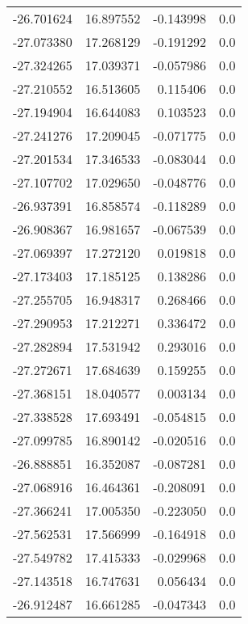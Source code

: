 \begin{tabular}{rrrr}
      -26.701624 &        16.897552 &   -0.143998 &   0.0 \\
      -27.073380 &        17.268129 &   -0.191292 &   0.0 \\
      -27.324265 &        17.039371 &   -0.057986 &   0.0 \\
      -27.210552 &        16.513605 &    0.115406 &   0.0 \\
      -27.194904 &        16.644083 &    0.103523 &   0.0 \\
      -27.241276 &        17.209045 &   -0.071775 &   0.0 \\
      -27.201534 &        17.346533 &   -0.083044 &   0.0 \\
      -27.107702 &        17.029650 &   -0.048776 &   0.0 \\
      -26.937391 &        16.858574 &   -0.118289 &   0.0 \\
      -26.908367 &        16.981657 &   -0.067539 &   0.0 \\
      -27.069397 &        17.272120 &    0.019818 &   0.0 \\
      -27.173403 &        17.185125 &    0.138286 &   0.0 \\
      -27.255705 &        16.948317 &    0.268466 &   0.0 \\
      -27.290953 &        17.212271 &    0.336472 &   0.0 \\
      -27.282894 &        17.531942 &    0.293016 &   0.0 \\
      -27.272671 &        17.684639 &    0.159255 &   0.0 \\
      -27.368151 &        18.040577 &    0.003134 &   0.0 \\
      -27.338528 &        17.693491 &   -0.054815 &   0.0 \\
      -27.099785 &        16.890142 &   -0.020516 &   0.0 \\
      -26.888851 &        16.352087 &   -0.087281 &   0.0 \\
      -27.068916 &        16.464361 &   -0.208091 &   0.0 \\
      -27.366241 &        17.005350 &   -0.223050 &   0.0 \\
      -27.562531 &        17.566999 &   -0.164918 &   0.0 \\
      -27.549782 &        17.415333 &   -0.029968 &   0.0 \\
      -27.143518 &        16.747631 &    0.056434 &   0.0 \\
      -26.912487 &        16.661285 &   -0.047343 &   0.0 \\

\end{tabular}
